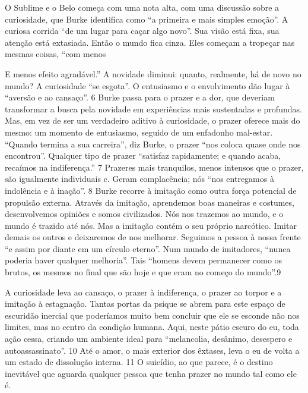  \par 
O Sublime e o Belo começa com uma nota alta, com uma discussão sobre a curiosidade, que Burke identifica como “a primeira e mais simples emoção”. A curiosa corrida “de um lugar para caçar algo novo”. Sua visão está fixa, sua atenção está extasiada. Então o mundo fica cinza. Eles começam a tropeçar nas mesmas coisas, “com menos
 \par 
E menos efeito agradável.” A novidade diminui: quanto, realmente, há de novo no mundo? A curiosidade “se esgota”. O entusiasmo e o envolvimento dão lugar à “aversão e ao cansaço”. {\color{blue}6} Burke passa para o prazer e a dor, que deveriam transformar a busca pela novidade em experiências mais sustentadas e profundas. Mas, em vez de ser um verdadeiro aditivo à curiosidade, o prazer oferece mais do mesmo: um momento de entusiasmo, seguido de um enfadonho mal-estar. “Quando termina a sua carreira”, diz Burke, o prazer “nos coloca quase onde nos encontrou”. Qualquer tipo de prazer “satisfaz rapidamente; e quando acaba, recaímos na indiferença.” {\color{blue}7} Prazeres mais tranquilos, menos intensos que o prazer, são igualmente individuais c. Geram complacência; nós “nos entregamos à indolência e à inação”. {\color{blue}8} Burke recorre à imitação como outra força potencial de propulsão externa. Através da imitação, aprendemos boas maneiras e costumes, desenvolvemos opiniões e somos civilizados. Nós nos trazemos ao mundo, e o mundo é trazido até nós. Mas a imitação contém o seu próprio narcótico. Imitar demais os outros e deixaremos de nos melhorar. Seguimos a pessoa à nossa frente “e assim por diante em um círculo eterno”. Num mundo de imitadores, “nunca poderia haver qualquer melhoria”. Tais “homens devem permanecer como os brutos, os mesmos no final que são hoje e que eram no começo do mundo”.{\color{blue}9}
 \par 
A curiosidade leva ao cansaço, o prazer à indiferença, o prazer ao torpor e a imitação à estagnação. Tantas portas da psique se abrem para este espaço de escuridão inercial que poderíamos muito bem concluir que ele se esconde não nos limites, mas no centro da condição humana. Aqui, neste pátio escuro do eu, toda ação cessa, criando um ambiente ideal para “melancolia, desânimo, desespero e autoassassinato”. {\color{blue}10} Até o amor, o mais exterior dos êxtases, leva o eu de volta a um estado de dissolução interna. {\color{blue}11} O suicídio, ao que parece, é o destino inevitável que aguarda qualquer pessoa que tenha prazer no mundo tal como ele é.
 \par 
